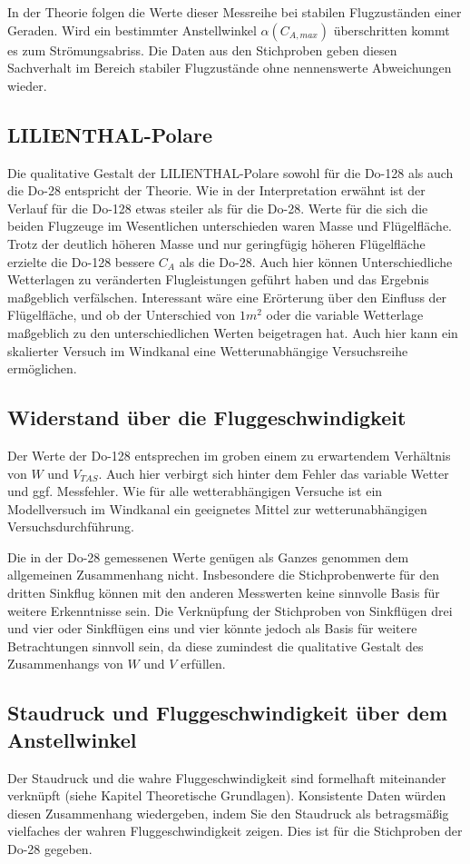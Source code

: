 \documentclass[11pt]{scrartcl}
\begin{document}
In der Theorie folgen die Werte dieser Messreihe bei stabilen Flugzuständen einer Geraden. Wird ein bestimmter Anstellwinkel $\alpha({C_{A,max}})$ überschritten kommt es zum Strömungsabriss.
Die Daten aus den Stichproben geben diesen Sachverhalt im Bereich stabiler Flugzustände ohne nennenswerte Abweichungen wieder.

\subsection{LILIENTHAL-Polare}

Die qualitative Gestalt der LILIENTHAL-Polare sowohl für die Do-128 als auch die Do-28 entspricht der Theorie. Wie in der Interpretation erwähnt ist der Verlauf für die Do-128 etwas steiler als für die Do-28. Werte für die sich die beiden Flugzeuge im Wesentlichen unterschieden waren Masse und Flügelfläche. Trotz der deutlich höheren Masse und nur geringfügig höheren Flügelfläche erzielte die Do-128 bessere $C_{A}$ als die Do-28.
Auch hier können Unterschiedliche Wetterlagen zu veränderten Flugleistungen geführt haben und das Ergebnis maßgeblich verfälschen.
Interessant wäre eine Erörterung über den Einfluss der Flügelfläche, und ob der Unterschied von $1m^{2}$ oder die variable Wetterlage maßgeblich zu den unterschiedlichen Werten beigetragen hat. Auch hier kann ein skalierter Versuch im Windkanal eine Wetterunabhängige Versuchsreihe ermöglichen.

\subsection{Widerstand über die Fluggeschwindigkeit}

Der Werte der Do-128 entsprechen im groben einem zu erwartendem Verhältnis von $W$ und $V_{TAS}$. Auch hier verbirgt sich hinter dem Fehler das variable Wetter und ggf. Messfehler. Wie für alle wetterabhängigen Versuche ist ein Modellversuch im Windkanal ein geeignetes Mittel zur wetterunabhängigen Versuchsdurchführung.

Die in der Do-28 gemessenen Werte genügen als Ganzes genommen dem allgemeinen Zusammenhang nicht. Insbesondere die Stichprobenwerte für den dritten Sinkflug können mit den anderen Messwerten keine sinnvolle Basis für weitere Erkenntnisse sein.
Die Verknüpfung der Stichproben von Sinkflügen drei und vier oder Sinkflügen eins und vier könnte jedoch als Basis für weitere Betrachtungen sinnvoll sein, da diese zumindest die qualitative Gestalt des Zusammenhangs von $W$ und $V$ erfüllen.

\subsection{Staudruck und Fluggeschwindigkeit über dem Anstellwinkel}

Der Staudruck und die wahre Fluggeschwindigkeit sind formelhaft miteinander verknüpft (siehe Kapitel Theoretische Grundlagen). Konsistente Daten würden diesen Zusammenhang wiedergeben, indem Sie den Staudruck als betragsmäßig vielfaches der wahren Fluggeschwindigkeit zeigen. Dies ist für die Stichproben der Do-28 gegeben.
\end{document}
